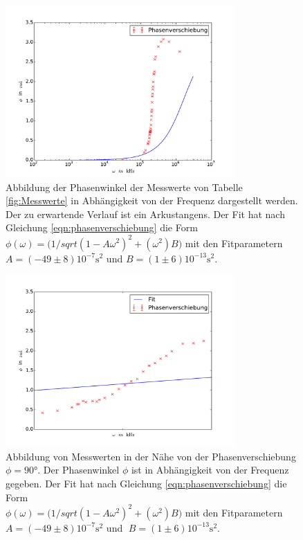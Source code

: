 \begin{figure}
  \centering
  \includegraphics[width=0.78\textwidth]{phasenverschiebung.pdf}
  \caption{Abbildung der Phasenwinkel der Messwerte von Tabelle \ref{fig:Messwerte} in
  Abhängigkeit von der Frequenz dargestellt werden. Der zu erwartende Verlauf ist
  ein Arkustangens. Der Fit hat nach Gleichung \eqref{eqn:phasenverschiebung} die Form \\
  $\phi(\omega)=(1/sqrt{(1-A\omega^2)^2+(\omega^2)B)}$
  mit den Fitparametern \\
  $A=(-49\pm8)10^{-7}\si{\second}^2$ und $B=(1\pm6)10^{-13}\si{\second}^2$.}
  \label{fig:phasenverschiebung}
\end{figure}
\begin{figure}
  \centering
  \includegraphics[width=0.78\textwidth]{linphasenverschiebung.pdf}
  \caption{Abbildung von Messwerten in der Nähe von der Phasenverschiebung $\phi=90°$.
          Der Phasenwinkel $\phi$ ist in Abhängigkeit von der Frequenz gegeben.
           Der Fit hat nach Gleichung \eqref{eqn:phasenverschiebung} die Form \\
          $\phi(\omega)=(1/sqrt{(1-A\omega^2)^2+(\omega^2)B)}$
          mit den Fitparametern \\
          $A=(-49\pm8)10^{-7}\si{\second}^2$ und $\;B=(1\pm6)10^{-13}\si{\second}^2$.}
  \label{fig:linphasenverschiebung}
\end{figure}
